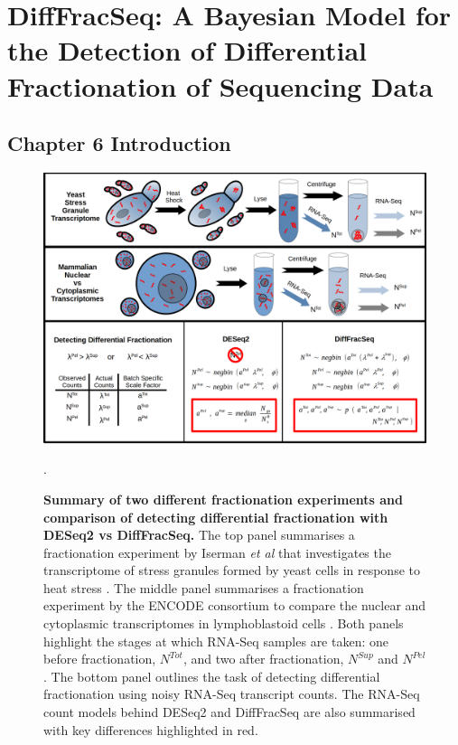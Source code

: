\documentclass[../main.tex]{subfiles}
\begin{document}
\chapter{{DiffFracSeq: A Bayesian Model for the Detection of Differential Fractionation of Sequencing Data}}

\section{Chapter 6 Introduction}

\begin{figure}

{\centering \includegraphics[width=1\linewidth]{figures/diffFracSeq_diagram.png} 

}

\caption[DiffFracSeq chapter summary.]{\textbf{Summary of two different fractionation experiments and comparison of detecting differential fractionation with DESeq2 vs DiffFracSeq.} The top panel summarises a fractionation experiment by Iserman \textit{et al} that investigates the transcriptome of stress granules formed by yeast cells in response to heat stress \parencite{Iserman2020}. The middle panel summarises a fractionation experiment by the ENCODE consortium to compare the nuclear and cytoplasmic transcriptomes in lymphoblastoid cells \parencite{Dunham2012}. Both panels highlight the stages at which RNA-Seq samples are taken: one before fractionation, $N^{Tot}$, and two after fractionation, $N^{Sup}$ and $N^{Pel}$. The bottom panel outlines the task of detecting differential fractionation using noisy RNA-Seq transcript counts. The RNA-Seq count models behind DESeq2 and DiffFracSeq are also summarised with key differences highlighted in red.}. \label{fig:diffFracSeq-diagram}
\end{figure}
\end{document}
